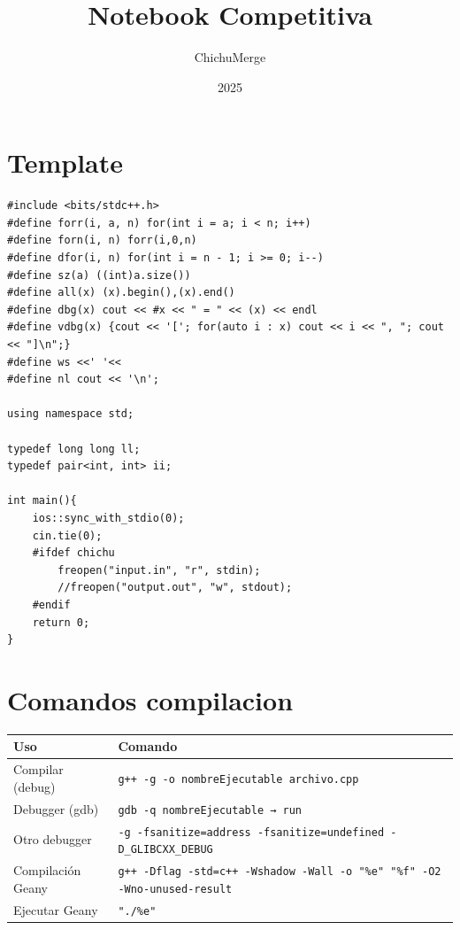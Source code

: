 \documentclass{article}
\title{Notebook Competitiva}
\author{ChichuMerge}
\date{2025}
\begin{document}
\maketitle
\tableofcontents 
\newpage     


\section{Template}
\begin{lstlisting}
#include <bits/stdc++.h>
#define forr(i, a, n) for(int i = a; i < n; i++)
#define forn(i, n) forr(i,0,n)
#define dfor(i, n) for(int i = n - 1; i >= 0; i--)
#define sz(a) ((int)a.size())
#define all(x) (x).begin(),(x).end()
#define dbg(x) cout << #x << " = " << (x) << endl
#define vdbg(x) {cout << '['; for(auto i : x) cout << i << ", "; cout << "]\n";}
#define ws <<' '<<
#define nl cout << '\n';

using namespace std;

typedef long long ll;
typedef pair<int, int> ii;

int main(){
	ios::sync_with_stdio(0);
	cin.tie(0);
	#ifdef chichu
		freopen("input.in", "r", stdin);
		//freopen("output.out", "w", stdout);
	#endif
	return 0;
}
\end{lstlisting}

\section{Comandos compilacion}
\begin{center}
\begin{tabular}{|l|p{10cm}|}
\hline
\textbf{Uso} & \textbf{Comando} \\
\hline
Compilar (debug) & \texttt{g++ -g -o nombreEjecutable archivo.cpp} \\
\hline
Debugger (gdb) & \texttt{gdb -q nombreEjecutable → run} \\
\hline
Otro debugger & \texttt{-g -fsanitize=address -fsanitize=undefined -D\_GLIBCXX\_DEBUG} \\
\hline
Compilación Geany & \texttt{g++ -Dflag -std=c++ -Wshadow -Wall -o "\%e" "\%f" -O2 -Wno-unused-result} \\
\hline
Ejecutar Geany & \texttt{"./\%e"} \\
\hline
\end{tabular}
\end{center}
\medskip
\end{document}
